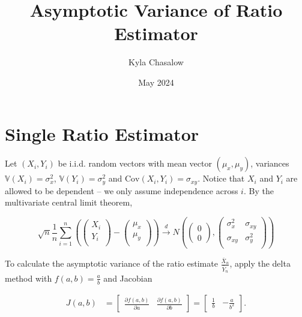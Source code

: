 \documentclass{article}
\title{Asymptotic Variance of Ratio Estimator}
\author{Kyla Chasalow}
\date{May 2024}
\newcommand{\Var}{\mathbb{V}}
\newcommand{\Cov}{\mbox{Cov}}
\theoremstyle{definition}
\begin{document}
\maketitle

\section{Single Ratio Estimator}

Let $(X_i,Y_i)$ be i.i.d. random vectors with mean vector $(\mu_x,\mu_y)$, variances $\Var(X_i)=\sigma_x^2$, $\Var(Y_i)=\sigma_y^2$ and $\Cov(X_i,Y_i)=\sigma_{xy}$. Notice that $X_i$ and $Y_i$ are allowed to be dependent -- we only assume independence across $i$. By the multivariate central limit theorem, 

\begin{equation*} \sqrt{n} \frac{1}{n}\sum_{i=1}^{n}
    \left(\left(\begin{array}{c}
        X_i  \\
        Y_i  \\ 
    \end{array}\right) - \left(\begin{array}{c}
        \mu_x  \\
        \mu_y  \\ 
    \end{array}\right)\right) \xrightarrow{d}
    N\left(\left(\begin{array}{c}
        0  \\
        0 
    \end{array}\right),\left(\begin{array}{cc}
        \sigma_x^2  &  \sigma_{xy} \\
        \sigma_{xy} & \sigma_y^2 \\
    \end{array}\right)\right)
\end{equation*}

To calculate the asymptotic variance of the ratio estimate $\frac{\bar{X}_n}{\bar{Y}_n}$, apply the delta method with $f(a,b)=\frac{a}{b}$ and Jacobian

\begin{align*} 
J(a,b) &= \begin{bmatrix}
\frac{\partial f(a,b) }{\partial a} & \frac{\partial f(a,b) }{\partial b}
\end{bmatrix} = \begin{bmatrix}
\frac{1}{b} &  -\frac{a}{b^2}
\end{bmatrix}.
\end{align*}  
\end{document}
